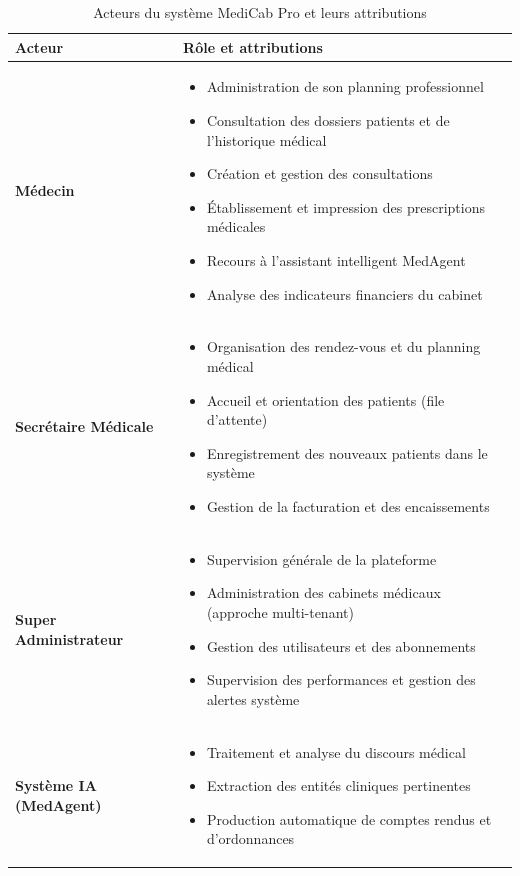 \begin{table}[H]
\centering
\caption{Acteurs du système MediCab Pro et leurs attributions}
\label{tab:acteurs}
\renewcommand{\arraystretch}{1.4}
\begin{tabularx}{\textwidth}{|>{\bfseries}p{3cm}|X|}
\hline
\textbf{Acteur} & \textbf{Rôle et attributions} \\
\hline
Médecin &
  \begin{itemize}[leftmargin=*,noitemsep,topsep=2pt]
    \item Administration de son planning professionnel
    \item Consultation des dossiers patients et de l'historique médical
    \item Création et gestion des consultations
    \item Établissement et impression des prescriptions médicales
    \item Recours à l'assistant intelligent MedAgent
    \item Analyse des indicateurs financiers du cabinet
  \end{itemize} \\
\hline
Secrétaire Médicale &
  \begin{itemize}[leftmargin=*,noitemsep,topsep=2pt]
    \item Organisation des rendez-vous et du planning médical
    \item Accueil et orientation des patients (file d'attente)
    \item Enregistrement des nouveaux patients dans le système
    \item Gestion de la facturation et des encaissements
  \end{itemize} \\
\hline
Super Administrateur &
  \begin{itemize}[leftmargin=*,noitemsep,topsep=2pt]
    \item Supervision générale de la plateforme
    \item Administration des cabinets médicaux (approche multi-tenant)
    \item Gestion des utilisateurs et des abonnements
    \item Supervision des performances et gestion des alertes système
  \end{itemize} \\
\hline
Système IA (MedAgent) &
  \begin{itemize}[leftmargin=*,noitemsep,topsep=2pt]
    \item Traitement et analyse du discours médical
    \item Extraction des entités cliniques pertinentes
    \item Production automatique de comptes rendus et d'ordonnances
  \end{itemize} \\
\hline
\end{tabularx}
\end{table}

